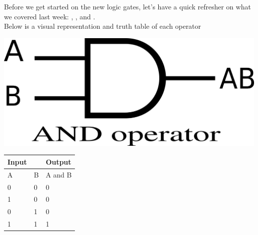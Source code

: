 

 
\begin{center}
	Before we get started on the new logic gates, let's have a quick refresher on what we covered last week: , , and  . \\Below is a visual representation and truth table of each operator
\end{center}

\vspace{20mm}
\hspace{1in}
\begin{minipage}{.5\linewidth}
    \includegraphics[width=3 in]{images/and.png}
\end{minipage}
\begin{minipage}{\linewidth}
\begin{tabular}{|ll|l|}
	\hline
	Input                   &   & Output  \\ \hline
	\multicolumn{1}{|l|}{A} & B & A and B \\ \hline
	\multicolumn{1}{|l|}{0} & 0 & 0       \\ \hline
	\multicolumn{1}{|l|}{1} & 0 & 0       \\ \hline
	\multicolumn{1}{|l|}{0} & 1 & 0       \\ \hline
	\multicolumn{1}{|l|}{1} & 1 & 1       \\ \hline
\end{tabular}
\end{minipage}


